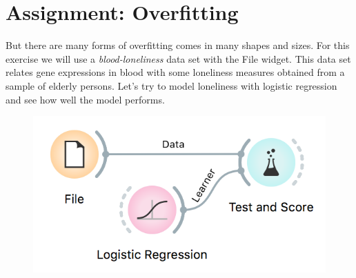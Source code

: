 \chapter{Assignment: Overfitting}
\label{hw:overfitting}

 But there are many forms of overfitting comes in many shapes and sizes. For this exercise we will use a \emph{blood-loneliness} data set with the File widget. This data set relates gene expressions in blood with some loneliness measures obtained from a sample of elderly persons. Let’s try to model loneliness with logistic regression and see how well the model performs.


\begin{figure}[h]
  \centering
  \includegraphics[scale=0.8]{overfitting1.png}%
  \caption{$\;$}
  \label{fig:wf1}
\end{figure}


